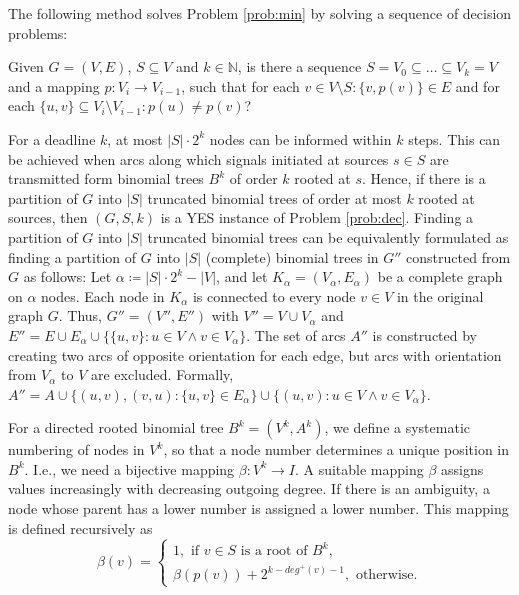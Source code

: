 The following method solves Problem \ref{prob:min} by solving a sequence of decision problems:
\begin{problem}
\label{prob:dec}
Given $G=(V,E)$, $S\subseteq V$ and $k\in \mathbb{N}$, is there a sequence $S=V_0\subseteq\dots\subseteq V_k=V$ and a mapping $p:V_i\to V_{i-1}$, such that for each $v\in V\setminus S:\{v,p(v)\}\in E$ and for each $\{u,v\}\subseteq V_i\setminus V_{i-1}: p(u)\neq p(v)$?
\end{problem}
For a deadline $k$, at most $|S|\cdot 2^k$ nodes can be informed within $k$ steps. 
This can be achieved when arcs along which signals initiated at sources $s\in S$ are transmitted form binomial trees $B^k$ of order $k$ rooted at $s$.
Hence, if there is a partition of $G$ into $|S|$ truncated binomial trees of order at most $k$ rooted at sources, then $(G,S,k)$ is a YES instance of Problem \ref{prob:dec}.
Finding a partition of $G$ into $|S|$ truncated binomial trees can be equivalently formulated as finding a partition of $G$ into $|S|$ (complete) binomial trees in $G''$ constructed from $G$ as follows:
Let $\alpha\coloneqq |S|\cdot 2^k-|V|$, and let $K_\alpha=(V_\alpha,E_\alpha)$ be a complete graph on $\alpha$ nodes.
Each node in $K_\alpha$ is connected to every node $v\in V$ in the original graph $G$.
Thus, $G''=(V'',E'')$ with $V''=V\cup V_\alpha$ and $E''=E\cup E_\alpha\cup \{\{u,v\}: u\in V \wedge v\in V_\alpha\}$.
The set of arcs $A''$ is constructed by creating two arcs of opposite orientation for each edge, but arcs with orientation from $V_\alpha$ to $V$ are excluded. 
Formally, $A''=A\cup\{(u,v),(v,u): \{u,v\}\in E_\alpha\}\cup\{(u,v):u\in V \wedge v\in V_\alpha\}$.

For a directed rooted binomial tree $B^k=(V^k,A^k)$, we define a systematic numbering of nodes in $V^k$, so that a node number determines a unique position in $B^k$.
I.e., we need a bijective mapping $\beta: V^k \to I$.
A suitable mapping $\beta$ assigns values increasingly with decreasing outgoing degree. 
If there is an ambiguity, a node whose parent has a lower number is assigned a lower number.
This mapping is defined recursively as
\begin{equation}
\label{eq:beta}
\beta(v)=\begin{cases}
1,\text{ if } v\in S \text{ is a root of } B^k,\\
\beta(p(v)) + 2^{k-deg^+(v)-1}, \text{ otherwise}.
\end{cases}
\end{equation}

